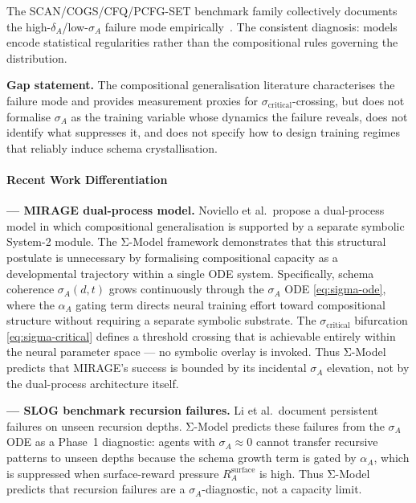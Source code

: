 \documentclass[10pt]{article}
\begin{document}
The SCAN/COGS/CFQ/PCFG-SET benchmark family collectively documents the
high-$\delta_A$/low-$\sigma_A$ failure mode empirically~\citep{mondorf2026compositionalarc}.
The consistent diagnosis: models encode statistical regularities rather than the
compositional rules governing the distribution.

\textbf{Gap statement.} The compositional generalisation literature
characterises the failure mode and provides measurement proxies for
$\sigma_{\text{critical}}$-crossing, but does not formalise $\sigma_A$
as the training variable whose dynamics the failure reveals, does not
identify what suppresses it, and does not specify how to design training
regimes that reliably induce schema crystallisation.

\paragraph{Recent Work Differentiation}

\textbf{\cite{noviello2025neuroscienceinspiredualprocess} --- MIRAGE dual-process model.}
Noviello et al.\ propose a dual-process model in which compositional
generalisation is supported by a separate symbolic System-2 module. The Σ-Model framework demonstrates that
this structural postulate is unnecessary by formalising compositional
capacity as a developmental trajectory within a single ODE system.
Specifically, schema coherence $\sigma_A(d,t)$ grows continuously
through the $\sigma_A$ ODE \eqref{eq:sigma-ode}, where the
$\alpha_A$ gating term directs neural training effort toward
compositional structure without requiring a separate symbolic substrate.
The $\sigma_{\text{critical}}$ bifurcation \eqref{eq:sigma-critical}
defines a threshold crossing that is achievable entirely within the
neural parameter space --- no symbolic overlay is invoked.
Thus Σ-Model predicts that MIRAGE's success is bounded by its incidental
$\sigma_A$ elevation, not by the dual-process architecture itself.

\textbf{\cite{li2023slogstructuralgeneralizationbenchmark} --- SLOG benchmark recursion failures.}
Li et al.\ document persistent failures on unseen recursion depths.
Σ-Model predicts these failures from the $\sigma_A$ ODE as a Phase~1
diagnostic: agents with $\sigma_A \approx 0$ cannot transfer recursive
patterns to unseen depths because the schema growth term is gated by
$\alpha_A$, which is suppressed when surface-reward pressure
$R_A^{\text{surface}}$ is high.
Thus Σ-Model predicts that recursion failures are a
$\sigma_A$-diagnostic, not a capacity limit.
\end{document}
